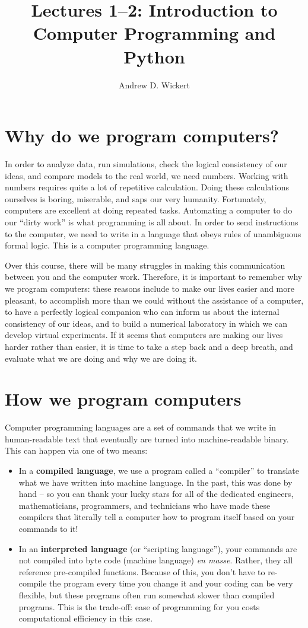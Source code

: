 \documentclass[a4paper,10pt]{scrartcl}
\title{Lectures 1--2: Introduction to Computer Programming and Python}
\author{Andrew D. Wickert}
\begin{document}
\maketitle

\section{Why do we program computers?}

In order to analyze data, run simulations, check the logical consistency of our ideas, and compare models to the real world, we need numbers. Working with numbers requires quite a lot of repetitive calculation. Doing these calculations ourselves is boring, miserable, and saps our very humanity. Fortunately, computers are excellent at doing repeated tasks. Automating a computer to do our ``dirty work'' is what programming is all about. In order to send instructions to the computer, we need to write in a language that obeys rules of unambiguous formal logic. This is a computer programming language.

Over this course, there will be many struggles in making this communication between you and the computer work. Therefore, it is important to remember why we program computers: these reasons include to make our lives easier and more pleasant, to accomplish more than we could without the assistance of a computer, to have a perfectly logical companion who can inform us about the internal consistency of our ideas, and to build a numerical laboratory in which we can develop virtual experiments. If it seems that computers are making our lives harder rather than easier, it is time to take a step back and a deep breath, and evaluate what we are doing and why we are doing it.

\section{How we program computers}

Computer programming languages are a set of commands that we write in human-readable text that eventually are turned into machine-readable binary. This can happen via one of two means:
\begin{itemize}
 \item In a \textbf{compiled language}, we use a program called a ``compiler'' to translate what we have written into machine language. In the past, this was done by hand -- so you can thank your lucky stars for all of the dedicated engineers, mathematicians, programmers, and technicians who have made these compilers that literally tell a computer how to program itself based on your commands to it!
 \item In an \textbf{interpreted language} (or ``scripting language''), your commands are not compiled into byte code (machine language) \textit{en masse}. Rather, they all reference pre-compiled functions. Because of this, you don't have to re-compile the program every time you change it and your coding can be very flexible, but these programs often run somewhat slower than compiled programs. This is the trade-off: ease of programming for you costs computational efficiency in this case.
\end{itemize}
\end{document}
